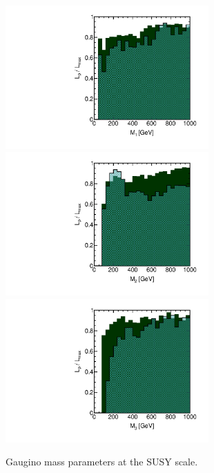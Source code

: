 \begin{figure}[htbp]
\begin{center}
\includegraphics[height=5.5cm]{figs/fig_M_1.pdf} 
\includegraphics[height=5.5cm]{figs/fig_M_2.pdf} \\
\includegraphics[height=5.5cm]{figs/fig_M_3.pdf}
\caption{Gaugino mass parameters at the SUSY scale.}
\label{default}
\end{center}
\end{figure}


